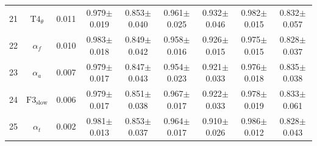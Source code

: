 \documentclass[pdflatex,sn-mathphys]{sn-jnl}%
\theoremstyle{thmstyleone}%
\theoremstyle{thmstyletwo}%
\theoremstyle{thmstylethree}%
\begin{document}
\begin{appendices}
\begin{table}[h!]
{\begin{tabular}{r|cccccccc}
  21 &          $\text{T4}_{\theta}$ &  0.011 &          0.979$\pm$0.019 &          0.853$\pm$0.040 &          0.961$\pm$0.025 &          0.932$\pm$0.046 &          0.982$\pm$0.015 &          0.832$\pm$0.057 \\
  22 &                  $\alpha_{f}$ &  0.010 &          0.983$\pm$0.018 &          0.849$\pm$0.042 &          0.958$\pm$0.016 &          0.926$\pm$0.015 &          0.975$\pm$0.015 &          0.828$\pm$0.037 \\
  23 &                  $\alpha_{a}$ &  0.007 &          0.979$\pm$0.017 &          0.847$\pm$0.043 &          0.954$\pm$0.023 &          0.921$\pm$0.033 &          0.976$\pm$0.018 &          0.835$\pm$0.038 \\
  24 &       $\text{F3}_\text{slow}$ &  0.006 &          0.979$\pm$0.017 &          0.851$\pm$0.038 &          0.967$\pm$0.017 &          0.922$\pm$0.033 &          0.978$\pm$0.019 &          0.833$\pm$0.061 \\
  25 &                  $\alpha_{t}$ &  0.002 &          0.981$\pm$0.013 &          0.853$\pm$0.037 &          0.964$\pm$0.017 &          0.910$\pm$0.026 &          0.986$\pm$0.012 &          0.828$\pm$0.043 \\
\hline
\end{tabular}
}
\end{table}



\end{appendices}
\end{document}
